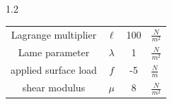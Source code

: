 \documentclass[preview]{standalone}
\begin{document}
\begin{spacing}{1.2}
\begin{tabular}{cccl}
\toprule
Lagrange multiplier & $\ell$ & 100 & $\frac{N}{m^2}$ \\ 
Lame parameter & $\lambda$ & 1 & $\frac{N}{m^2}$ \\ 
applied surface load & $f$ & -5 & $\frac{N}{m}$ \\ 
shear modulus & $\mu$ & 8 & $\frac{N}{m^2}$ \\ 
\bottomrule
\end{tabular}
\end{spacing}
\end{document}

